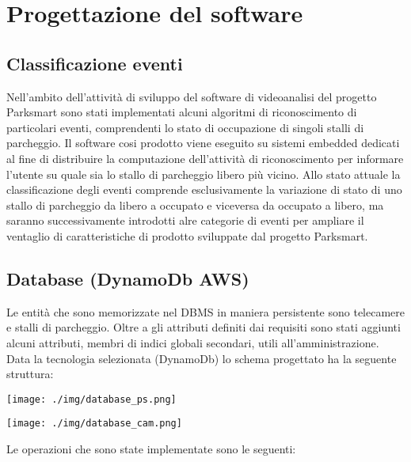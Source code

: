 \chapter{Progettazione del software}


\section{Classificazione eventi}
Nell'ambito dell'attività di sviluppo del software di videoanalisi del progetto Parksmart sono stati implementati alcuni algoritmi di riconoscimento di particolari eventi, comprendenti lo stato di occupazione di singoli stalli di parcheggio. Il software cosi prodotto viene eseguito su sistemi embedded dedicati al fine di distribuire la computazione dell'attività di riconoscimento per informare l'utente su quale sia lo stallo di parcheggio libero più vicino. Allo stato attuale la classificazione degli eventi comprende esclusivamente la variazione di stato di uno stallo di parcheggio da libero a occupato e viceversa da occupato a libero, ma saranno successivamente introdotti alre categorie di eventi per ampliare il ventaglio di caratteristiche di prodotto sviluppate dal progetto Parksmart.
\vspace{5.7truecm}

\section{Database (DynamoDb AWS)}
Le entità che sono memorizzate nel DBMS in maniera persistente sono telecamere e stalli di parcheggio. Oltre a gli attributi definiti dai requisiti sono stati aggiunti alcuni attributi, membri di indici globali secondari, utili all'amministrazione. Data la tecnologia selezionata (DynamoDb) lo schema progettato ha la seguente struttura:

\vspace{0.5truecm}

\centerline{\texttt{[image: ./img/database\_ps.png]}}

\vspace{0.5truecm}

\centerline{\texttt{[image: ./img/database\_cam.png]}}

\vspace{0.5truecm}

Le operazioni che sono state implementate sono le seguenti:


